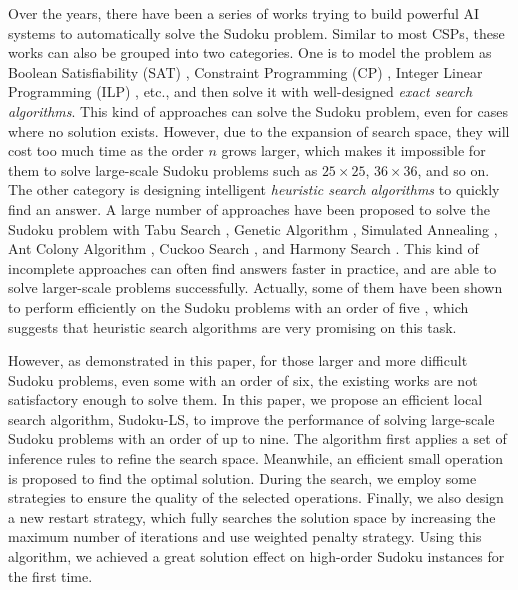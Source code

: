 \documentclass{article}
\begin{document}
Over the years, there have been a series of works trying to build powerful AI systems to automatically solve the Sudoku problem. Similar to most CSPs, these works can also be grouped into two categories.
One is to model the problem as Boolean Satisfiability (SAT) \cite{lynce2006sat,pfeiffer2010sat}, Constraint Programming (CP) \cite{simonis2005sudoku,crawford2009solving}, Integer Linear Programming (ILP) \cite{bartlett2008integer}, etc., and then solve it with well-designed \textit{exact search algorithms}.
This kind of approaches can solve the Sudoku problem, even for cases where no solution exists. However, due to the expansion of search space, they will cost too much time as the order $n$ grows larger, which makes it impossible for them to solve large-scale Sudoku problems such as $25 \times 25$, $36 \times 36$, and so on.
The other category is designing intelligent \textit{heuristic search algorithms} to quickly find an answer. A large number of approaches have been proposed to solve the Sudoku problem with Tabu Search \cite{soto2013ac3tabu}, Genetic Algorithm \cite{mantere2007sudoku,sato2010sudoku}, Simulated Annealing \cite{lewis2007metaheuristics}, Ant Colony Algorithm \cite{lloyd2020antcolony}, Cuckoo Search \cite{soto2014prefiltered}, and Harmony Search \cite{geem2007harmony}.
This kind of incomplete approaches can often find answers faster in practice, and are able to solve larger-scale problems successfully. Actually, some of them have been shown to perform efficiently on the Sudoku problems with an order of five \cite{musliu2017sudoku,lloyd2020antcolony}, which suggests that heuristic search algorithms are very promising on this task. 

However, as demonstrated in this paper, for those larger and more difficult Sudoku problems, even some with an order of six, the existing works are not satisfactory enough to solve them.
In this paper, we propose an efficient local search algorithm, Sudoku-LS, to improve the performance of solving large-scale Sudoku problems with an order of up to nine. 
The algorithm first applies a set of inference rules to refine the search space. Meanwhile, an efficient small operation is proposed to find the optimal solution. During the search, we employ some strategies to ensure the quality of the selected operations. Finally, we also design a new restart strategy, which fully searches the solution space by increasing the maximum number of iterations and use weighted penalty strategy.
Using this algorithm, we achieved a great solution effect on high-order Sudoku instances for the first time.
\end{document}
